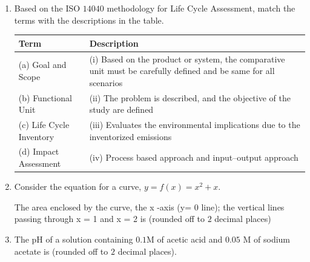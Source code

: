 \documentclass[journal]{IEEEtran}
\numberwithin{equation}{enumi}
\numberwithin{figure}{enumi}
\begin{document}
\begin{enumerate}[start=1, label={Q\arabic*.}]
\item Based on the ISO $14040$ methodology for Life Cycle Assessment, match the terms with
the descriptions in the table. 

\begin{center}
\renewcommand{\arraystretch}{1.3}
\setlength{\tabcolsep}{6pt} 
\begin{tabular}{|p{3cm}|p{8cm}|}
\hline
\textbf{Term} & \textbf{Description} \\ \hline
(a) Goal and Scope      & (i) Based on the product or system, the comparative unit must be carefully defined and be same for all scenarios \\ \hline
(b) Functional Unit     & (ii) The problem is described, and the objective of the study are defined \\ \hline
(c) Life Cycle \newline Inventory & (iii) Evaluates the environmental implications due to the inventorized emissions \\ \hline
(d) Impact \newline Assessment   & (iv) Process based approach and input--output approach \\ \hline
\end{tabular}
\end{center}
\begin{enumerate} [label=(\Alph*)]
\end{enumerate}
\item Consider the equation for a curve, $y = f(x) = x^2 + x$.

\vspace{0.1cm}
The area enclosed by the curve, the x -axis (y= $0$ line); the vertical lines passing through x = 1 and x = 2 is \underline{\hspace{1.5cm}}(rounded off to $2$ decimal places)

\vspace{0.1cm}

\item The pH of a solution containing $0.1$M of acetic acid and $0.05$ M of sodium acetate is
\underline{\hspace{1.5cm}} (rounded off to $2$ decimal places).


\end{enumerate}
\end{document}
